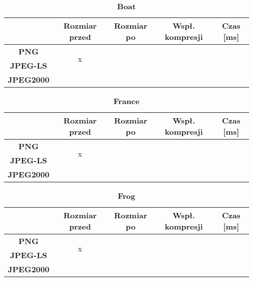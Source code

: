 \begin{table}[!h]
	\centering
	\caption{\textbf{Boat}}
	\label{my-label}
	\begin{tabular}{|c|c|c|c|c|}                                             
		\hline
		& \textbf{Rozmiar przed} & \textbf{Rozmiar po} & \textbf{Wspł. kompresji} & \textbf{Czas {[}ms{]}} \\ \hline 
		\textbf{PNG}      &          \multicolumn{1}{c|}{\multirow{2}{*}{x}}             &                     &                          &                             \\\cline{3-5}
		\textbf{JPEG-LS}  &                        &                     &                          &                          \\\cline{3-5}
		\textbf{JPEG2000} &                        &                     &                          &                      \\ \hline
	\end{tabular}
\end{table}

\begin{table}[!h]
	\centering
	\caption{\textbf{France}}
	\label{my-label}
	\begin{tabular}{|c|c|c|c|c|}                                             
		\hline
		& \textbf{Rozmiar przed} & \textbf{Rozmiar po} & \textbf{Wspł. kompresji} & \textbf{Czas {[}ms{]}} \\ \hline 
		\textbf{PNG}      &          \multicolumn{1}{c|}{\multirow{2}{*}{x}}             &                     &                          &                             \\\cline{3-5}
		\textbf{JPEG-LS}  &                        &                     &                          &                          \\\cline{3-5}
		\textbf{JPEG2000} &                        &                     &                          &                      \\ \hline
	\end{tabular}
\end{table}

\begin{table}[!h]
	\centering
	\caption{\textbf{Frog}}
	\label{my-label}
	\begin{tabular}{|c|c|c|c|c|}                                             
		\hline
		& \textbf{Rozmiar przed} & \textbf{Rozmiar po} & \textbf{Wspł. kompresji} & \textbf{Czas {[}ms{]}} \\ \hline 
		\textbf{PNG}      &          \multicolumn{1}{c|}{\multirow{2}{*}{x}}             &                     &                          &                             \\\cline{3-5}
		\textbf{JPEG-LS}  &                        &                     &                          &                          \\\cline{3-5}
		\textbf{JPEG2000} &                        &                     &                          &                      \\ \hline
	\end{tabular}
\end{table}

